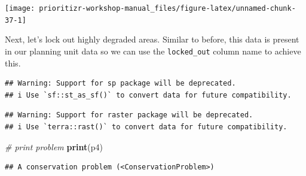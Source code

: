 \documentclass[12pt,]{book}
\newenvironment{Shaded}{\begin{snugshade}}{\end{snugshade}}
\newcommand{\CommentTok}[1]{\textcolor[rgb]{0.56,0.35,0.01}{\textit{#1}}}
\newcommand{\DataTypeTok}[1]{\textcolor[rgb]{0.13,0.29,0.53}{#1}}
\newcommand{\FloatTok}[1]{\textcolor[rgb]{0.00,0.00,0.81}{#1}}
\newcommand{\KeywordTok}[1]{\textcolor[rgb]{0.13,0.29,0.53}{\textbf{#1}}}
\newcommand{\NormalTok}[1]{#1}
\newcommand{\OperatorTok}[1]{\textcolor[rgb]{0.81,0.36,0.00}{\textbf{#1}}}
\newcommand{\OtherTok}[1]{\textcolor[rgb]{0.56,0.35,0.01}{#1}}
\newcommand{\StringTok}[1]{\textcolor[rgb]{0.31,0.60,0.02}{#1}}
\begin{document}
\begin{center}\texttt{[image: prioritizr-workshop-manual\_files/figure-latex/unnamed-chunk-37-1]} \end{center}

Next, let's lock out highly degraded areas. Similar to before, this data is present in our planning unit data so we can use the \texttt{locked\_out} column name to achieve this.

\begin{Shaded}
\end{Shaded}

\begin{verbatim}
## Warning: Support for sp package will be deprecated.
## i Use `sf::st_as_sf()` to convert data for future compatibility.
\end{verbatim}

\begin{verbatim}
## Warning: Support for raster package will be deprecated.
## i Use `terra::rast()` to convert data for future compatibility.
\end{verbatim}

\begin{Shaded}
\begin{Highlighting}[]
\CommentTok{# print problem}
\KeywordTok{print}\NormalTok{(p4)}
\end{Highlighting}
\end{Shaded}

\begin{verbatim}
## A conservation problem (<ConservationProblem>)
\end{verbatim}
\end{document}
